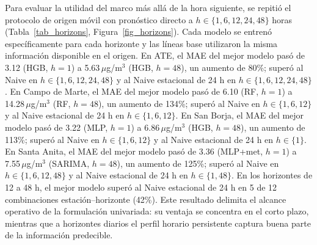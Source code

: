 Para evaluar la utilidad del marco más allá de la hora siguiente, se repitió el protocolo de origen móvil con pronóstico directo a $h \in \{1, 6, 12, 24, 48\}$ horas (Tabla~\ref{tab_horizons}, Figura~\ref{fig_horizons}). Cada modelo se entrenó específicamente para cada horizonte y las líneas base utilizaron la misma información disponible en el origen. En ATE, el MAE del mejor modelo pasó de 3.12 (HGB, $h=1$) a 5.63\,$\mu$g/m$^3$ (HGB, $h=48$), un aumento de 80\%; superó al Naive en $h \in \{1, 6, 12, 24, 48\}$ y al Naive estacional de 24 h en $h \in \{1, 6, 12, 24, 48\}$. En Campo de Marte, el MAE del mejor modelo pasó de 6.10 (RF, $h=1$) a 14.28\,$\mu$g/m$^3$ (RF, $h=48$), un aumento de 134\%; superó al Naive en $h \in \{1, 6, 12\}$ y al Naive estacional de 24 h en $h \in \{1, 6, 12\}$. En San Borja, el MAE del mejor modelo pasó de 3.22 (MLP, $h=1$) a 6.86\,$\mu$g/m$^3$ (HGB, $h=48$), un aumento de 113\%; superó al Naive en $h \in \{1, 6, 12\}$ y al Naive estacional de 24 h en $h \in \{1\}$. En Santa Anita, el MAE del mejor modelo pasó de 3.36 (MLP+met, $h=1$) a 7.55\,$\mu$g/m$^3$ (SARIMA, $h=48$), un aumento de 125\%; superó al Naive en $h \in \{1, 6, 12, 48\}$ y al Naive estacional de 24 h en $h \in \{1, 48\}$. En los horizontes de 12 a 48 h, el mejor modelo superó al Naive estacional de 24 h en 5 de 12 combinaciones estación--horizonte (42\%). Este resultado delimita el alcance operativo de la formulación univariada: su ventaja se concentra en el corto plazo, mientras que a horizontes diarios el perfil horario persistente captura buena parte de la información predecible.
